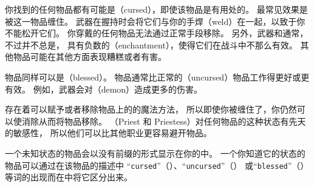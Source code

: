 \documentclass[a4paper, 10pt]{article}
\begin{document}
你找到的任何物品都有可能是\zhTransCursed（cursed），即使该物品是有用处的。
\zhTransCursed{}最常见效果是被这一物品缠住。
\zhTransCursed{}武器在握持时会将它们与你的手焊（weld）在一起，以致于你不能松开它们。
你穿戴的任何\zhTransCursed{}物品无法通过正常手段移除。
另外，\zhTransCursed{}武器和\zhTransArmor{}通常，不过并不总是，
具有负数的\zhTransEnchantments（enchantment），使得它们在战斗中不那么有效。
其他\zhTransCursed{}物品可能在其他方面表现糟糕或者有害。

物品同样可以是\zhTransBlessed（blessed）。
\zhTransBlessed{}物品通常比正常的\zhTransUncursed{}（uncursed）物品工作得更好或更有效。
例如，\zhTransBlessed{}武器会对\zhTransDemons{}（demon）造成更多的伤害。

存在着可以赋予或者移除物品上的\zhTransCurses{}的魔法方法，
所以即使你被缠住了，你仍然可以使\zhTransCurses{}消除从而将物品移除。
\zhTransPriests{}（Priest 和 Priestess）对任何物品的这种状态有先天的敏感性，
所以他们可以比其他职业更容易避开\zhTransCursed{}物品。

一个未知状态的物品会以没有前缀的形式显示在你的\zhTransInventory{}中。
一个你知道它的状态的物品可以通过在该物品的描述中
“{\tt cursed}”（\zhTransCursed）、“{\tt uncursed}”（\zhTransUncursed）
或“{\tt blessed}”（\zhTransBlessed）等词的出现而在\zhTransInventory{}中将它区分出来。
\end{document}
